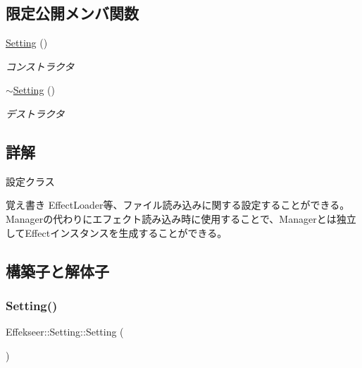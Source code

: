\subsection*{限定公開メンバ関数}
\begin{DoxyCompactItemize}
\item 
\mbox{\hyperlink{class_effekseer_1_1_setting_ac499390c801e98da46d278ef85e22cf6}{Setting}} ()
\begin{DoxyCompactList}\small\item\em コンストラクタ \end{DoxyCompactList}\item 
\mbox{\hyperlink{class_effekseer_1_1_setting_a0f16b991666d7968cefd52f61c61ccec}{$\sim$\+Setting}} ()
\begin{DoxyCompactList}\small\item\em デストラクタ \end{DoxyCompactList}\end{DoxyCompactItemize}


\subsection{詳解}
設定クラス 

\begin{DoxyNote}{覚え書き}
Effect\+Loader等、ファイル読み込みに関する設定することができる。 Managerの代わりにエフェクト読み込み時に使用することで、\+Managerとは独立して\+Effectインスタンスを生成することができる。 
\end{DoxyNote}


\subsection{構築子と解体子}
\mbox{\label{class_effekseer_1_1_setting_ac499390c801e98da46d278ef85e22cf6}} 
\subsubsection{\texorpdfstring{Setting()}{Setting()}}
{\footnotesize\ttfamily Effekseer\+::\+Setting\+::\+Setting (\begin{DoxyParamCaption}{ }\end{DoxyParamCaption})\hspace{0.3cm}{\ttfamily [protected]}}



